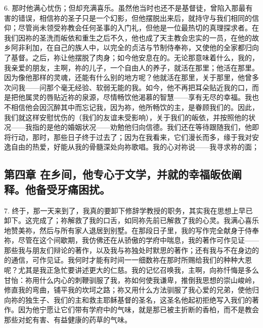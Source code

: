 6. 那时他满心忧伤；但却充满喜乐。虽然他当时也还不是基督徒，曾陷入那最有害的错误，相信祢的圣子只是一个幻影，但他摆脱出来后，就持守与我们相同的信仰；尽管尚未领受祢教会任何圣事的入门礼，但他是一位最热切的真理探求者。在我们因祢的圣洗而皈依和重生之后不久，他也成了天主教会忠实的一员，在他的故乡阿非利加，在自己的族人中，以完全的贞洁与节制侍奉祢，又使他的全家都归向了基督。之后，祢让他摆脱了肉身；如今他安息在的。无论那意味着什么，我的，我亲爱的朋友，主啊，祢的儿子，一个自由人的养子，就活在那里；他活在那里。因为像他那样的灵魂，还能有什么别的地方呢？他就活在那里，关于那里，他曾多次问我——问那个毫无经验、软弱无能的我。如今，他不再把耳朵贴近我的口，而是把他属灵的唇贴近祢的泉源，尽情畅饮他渴慕的智慧——享有无尽的幸福。我也不相信他会因沉醉其中而忘记我，因为祢，他所畅饮的主，是眷顾我们的。因此，我们就这样安慰忧伤的（我们的友谊未受影响），关于我们的皈依，并按照他的状况——我指的是他的婚姻状况——劝勉他归向信德。我们还在等待跟随我们，他即将行动，那时，那些日子终于过去了；因为在我看来，它们漫长而多，缘于我对安逸自由的热爱，好能从我的骨髓深处向祢歌唱。我的心对祢说——我寻求祢的面；\par


\subsection{第四章 在乡间，他专心于文学，并就的幸福皈依阐释。他备受牙痛困扰。}

7. 终于，那一天来到了，我真的要卸下修辞学教授的职务，其实我在思想上早已卸下。这完成了；祢解救了我的口舌，如同祢先前已解救了我的心灵。我满心喜乐地赞美祢，然后与所有家人退居到别墅。在那段日子里，我的写作完全献身于侍奉祢，尽管在这个间歇期，我仿佛还在从骄傲的学府中喘息，我的著作可作见证——那些我与朋友们辩论的著作，以及我与祢独处时默思的著作；还有我与不在身边的的通信，可作见证。我何时才能有时间一一细数祢在那时所赐给我们的种种大恩呢？尤其是我正急忙要讲述更大的仁慈。我的记忆召唤我，主啊，向祢忏悔是多么甘怡：祢用什么内心的刺鞭驯服了我，祢如何使我谦卑，推倒我思想的崇山峻岭，修直我的弯曲，铺平我的坎坷之路；祢又用什么方法驯服了我心爱的兄弟，使他归向祢的独生子、我们的主和救主耶稣基督的圣名，这圣名他起初拒绝写入我们的著作。因为他宁愿让它们带有学府中的气味，就是那已被主折断的香柏，而不是教会那些对蛇有害、有益健康的药草的气味。\par

